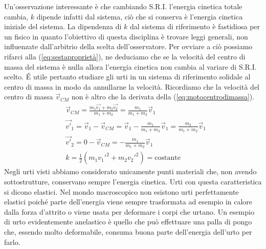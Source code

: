 Un'osservazione interessante è che cambiando S.R.I. l'energia cinetica totale cambia, $k$ dipende infatti dal sistema, ciò che si conserva è l'energia cinetica iniziale del sistema. La dipendenza di $k$ dal sistema di riferimento è fastidiosa per un fisico in quanto l'obiettivo di questa disciplina è trovare leggi generali, non influenzate dall'arbitrio della scelta dell'osservatore. Per ovviare a ciò possiamo rifarci alla (\ref{eq:sestaproprietà}), ne deduciamo che se la velocità del centro di massa del sistema è nulla allora l'energia cinetica non cambia al variare di S.R.I. scelto. \'{E} utile pertanto studiare gli urti in un sistema di riferimento solidale al centro di massa in modo da annullarne la velocità. Ricordiamo che la velocità del centro di massa $\vec{v}_{CM}$ non è altro che la derivata della (\ref{eq:motocentrodimassa}).
\begin{align*}
 &\vec{v}_{CM} = \frac{m_1\vec{v_1}+m_2\vec{v_2}}{m_1+m_2}= \frac{m_1}{m_1+m_2}\vec{v}_1\\
 &\vec{v'}_1 = \vec{v}_1 - \vec{v}_{CM} =  \vec{v}_1 - \frac{m_1}{m_1+m_2}\vec{v}_1 = \frac{m_2}{m_1 + m_2}\vec{v}_1\\
 &\vec{v'}_2 = 0 - \vec{v}_{CM} = -\frac{m_1}{m_1+m_2}\vec{v}_1\\
  &k = \frac{1}{2}(m_1 v_1'^2+m_2 v_2'^2) = \text{costante}
\end{align*}
Negli urti visti abbiamo considerato unicamente punti materiali che, non avendo sottostrutture, conservano sempre l'energia cinetica. Urti con questa caratteristica si dicono elastici. Nel mondo macroscopico non esistono urti perfettamente elastici poiché parte dell'energia viene sempre trasformata ad esempio in calore dalla forza d'attrito o viene usata per deformare i corpi che urtano. Un esempio di urto evidentemente anelastico è quello che può effettuare una palla di pongo che, essendo molto deformabile, consuma buona parte dell'energia dell'urto per farlo.
